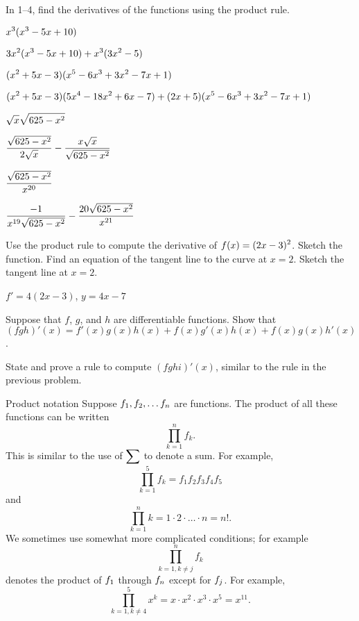 \begin{exercises}

In 1--4, find the derivatives of the functions using the product rule.

\exercise $\displaystyle x^3(x^3-5x+10)$
\begin{answer} $\displaystyle 3x^2(x^3-5x+10)+x^3(3x^2-5)$
\end{answer}

\exercise $\displaystyle (x^2+5x-3)(x^5-6x^3+3x^2-7x+1)$
\begin{answer} $\displaystyle (x^2+5x-3)(5x^4-18x^2+6x-7)+(2x+5)(x^5-6x^3+3x^2-7x+1)$
\end{answer}

\exercise $\displaystyle \sqrt{x}\sqrt{625-x^2}$
\begin{answer} $\displaystyle \displaystyle{\sqrt{625-x^2}\over 2\sqrt{x}}-{x\sqrt{x}\over\sqrt{625-x^2}}$
\end{answer}

\exercise $\displaystyle {\sqrt{625-x^2}\over x^{20}}$
\begin{answer} $\displaystyle{-1\over x^{19}\sqrt{625-x^2}}-{20\sqrt{625-x^2}\over x^{21}}$
\end{answer}

\exercise Use the product rule to compute the derivative of $\displaystyle f(x)=(2x-3)^2$.
 Sketch the function.  Find an equation of the tangent line to the curve at
 $x=2$.  Sketch the tangent line at $x=2$.
\begin{answer} $f'=4(2x-3)$, $y=4x-7$
\end{answer}

\exercise
Suppose that $f$, $g$, and $h$ are differentiable functions.
Show that $(fgh)'(x) = f'(x) g(x)h(x) + f(x)g'(x) h(x) + f(x) g(x)
h'(x)$.

\exercise
State and prove a rule to compute $(fghi)'(x)$, 
similar to the rule in the previous problem.

\begin{remark}{Product notation}
Suppose $\displaystyle f_1 , f_2 , \ldots f_n$ are functions.
The product of all these functions can be written
$$ \prod _{k=1 } ^n f_k.$$
This is similar to the use of $\displaystyle \sum$ to denote a 
sum.
For example,
$$\prod _{k=1 } ^5 f_k =f_1 f_2 f_3 f_4 f_5$$
and
$$
\prod _ {k=1 } ^n k = 1\cdot 2 \cdot \ldots \cdot n = n!.$$
We sometimes use somewhat more complicated conditions; for example
$$\prod _{k=1 , k\neq j } ^n f_k$$
denotes the product of $\displaystyle f_1$ through $\displaystyle f_n$ except for $\displaystyle f_j$.
For example, 
$$\prod _{k=1 , k\neq 4} ^5 x^k = x\cdot x^2 \cdot x^3 \cdot x^5 =
x^{11}.$$
\end{remark}


\end{exercises}
